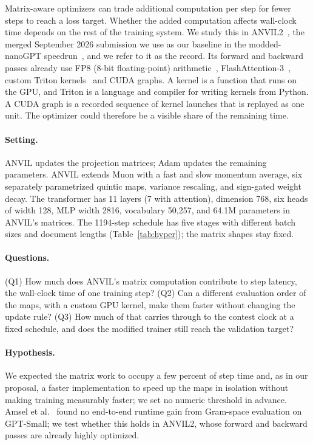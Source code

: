 \documentclass{article}
\begin{document}
Matrix-aware optimizers can trade additional computation per step for fewer steps to reach a loss target. Whether the added computation affects wall-clock time depends on the rest of the training system. We study this in ANVIL2~\cite{anvil2}, the merged September 2026 submission we use as our baseline in the modded-nanoGPT speedrun~\cite{speedrun}, and we refer to it as the record. Its forward and backward passes already use FP8 (8-bit floating-point) arithmetic~\cite{fp8}, FlashAttention-3~\cite{fa3}, custom Triton kernels~\cite{triton} and CUDA graphs. A kernel is a function that runs on the GPU, and Triton is a language and compiler for writing kernels from Python. A CUDA graph is a recorded sequence of kernel launches that is replayed as one unit. The optimizer could therefore be a visible share of the remaining time.

\paragraph{Setting.} ANVIL updates the projection matrices; Adam updates the remaining parameters. ANVIL extends Muon with a fast and slow momentum average, six separately parametrized quintic maps, variance rescaling, and sign-gated weight decay. The transformer has 11 layers (7 with attention), dimension 768, six heads of width 128, MLP width 2816, vocabulary 50,257, and 64.1M parameters in ANVIL's matrices. The 1194-step schedule has five stages with different batch sizes and document lengths (Table~\ref{tab:hyper}); the matrix shapes stay fixed.

\paragraph{Questions.} (Q1) How much does ANVIL's matrix computation contribute to step latency, the wall-clock time of one training step? (Q2) Can a different evaluation order of the maps, with a custom GPU kernel, make them faster without changing the update rule? (Q3) How much of that carries through to the contest clock at a fixed schedule, and does the modified trainer still reach the validation target?

\paragraph{Hypothesis.} We expected the matrix work to occupy a few percent of step time and, as in our proposal, a faster implementation to speed up the maps in isolation without making training measurably faster; we set no numeric threshold in advance. Amsel et al.~\cite{polar} found no end-to-end runtime gain from Gram-space evaluation on GPT-Small; we test whether this holds in ANVIL2, whose forward and backward passes are already highly optimized.
\end{document}
